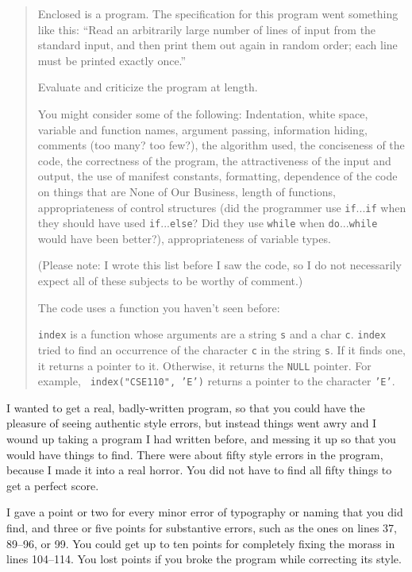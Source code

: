 \begin{quotation}
\small
Enclosed is a program.  The specification for this program went
something like this: ``Read an arbitrarily large number of lines of
input from the standard input, and then print them out again in random
order; each line must be printed exactly once.''

Evaluate and criticize the program at length.

You might consider some of the following: Indentation, white space,
variable and function names, argument passing, information hiding,
comments (too many?  too few?), the algorithm used, the conciseness of
the code, the correctness of the program, the attractiveness of the
input and output, the use of manifest constants, formatting, dependence
of the code on things that are None of Our Business, length of
functions, appropriateness of control structures (did the programmer use
{\tt if}...{\tt if} when they should have used {\tt if}...{\tt else}?
Did they use {\tt while} when {\tt do}...{\tt while} would have been
better?), appropriateness of variable types.

(Please note: I wrote this list before I saw the code, so I do not
necessarily expect all of these subjects to be worthy of comment.)

The code uses a function you haven't seen before:

{\tt index} is a function whose arguments are a string {\tt s} and a
char {\tt c}.  {\tt index} tried to find an occurrence of the character
{\tt c} in the string {\tt s}.  If it finds one, it returns a pointer to
it.  Otherwise, it returns the {\tt NULL} pointer.  For example, {\tt
index("CSE110", 'E')} returns a pointer to the character {\tt 'E'}.  

\end{quotation}

I wanted to get a real, badly-written program, so that you could have
the pleasure of seeing authentic style errors, but instead things went
awry and I wound up taking a program I had written before, and messing
it up so that you would have things to find.  There were about fifty
style errors in the program, because I made it into a real horror.  You
did not have to find all fifty things to get a perfect score.  

I gave a point or two for every minor error of typography or naming that
you did find, and three or five points for substantive errors, such as
the ones on lines 37, 89--96, or 99.  You could get up to ten points for
completely fixing the morass in lines 104--114.  You lost points if you
broke the program while correcting its style.


